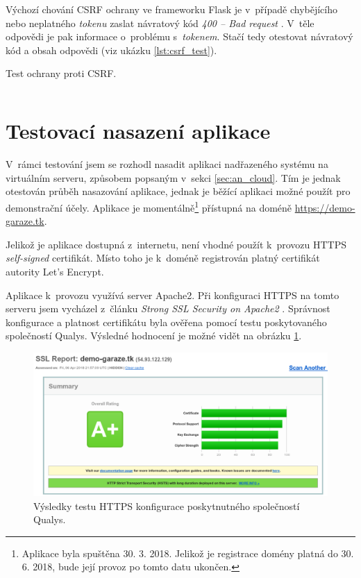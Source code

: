 Výchozí chování CSRF ochrany ve frameworku Flask je v~případě chybějícího nebo neplatného \textit{tokenu} zaslat návratový kód \textit{400 -- Bad request} \cite{flask_wtf}. V~těle odpovědi je pak informace o~problému s~\textit{tokenem}. Stačí tedy otestovat návratový kód a obsah odpovědi (viz ukázku \ref{lst:csrf_test}).

\begin{listing}[htbp]
\caption{\label{lst:csrf_test} Test ochrany proti CSRF.}
\inputminted[bgcolor=codebg]{python}{source-samples/csrf_test.py}
\end{listing}

\section{Testovací nasazení aplikace}
\label{sec:te_deployment}

V~rámci testování jsem se rozhodl nasadit aplikaci nadřazeného systému na virtuálním serveru, způsobem popsaným v~sekci \ref{sec:an_cloud}. Tím je jednak otestován průběh nasazování aplikace, jednak je běžící aplikaci možné použít pro demonstrační účely. Aplikace je momentálně\footnote{Aplikace byla spuštěna 30. 3. 2018. Jelikož je registrace domény platná do 30. 6. 2018, bude její provoz po tomto datu ukončen.} přístupná na doméně \url{https://demo-garaze.tk}.

Jelikož je aplikace dostupná z~internetu, není vhodné použít k~provozu HTTPS \textit{self-signed} certifikát. Místo toho je k~doméně registrován platný certifikát autority Let's Encrypt.

Aplikace k~provozu využívá server Apache2. Při konfiguraci HTTPS na tomto serveru jsem vycházel z~článku \textit{Strong SSL Security on Apache2} \cite{apache_ssl}. Správnost konfigurace a platnost certifikátu byla ověřena pomocí testu poskytovaného společností Qualys. Výsledné hodnocení je možné vidět na obrázku \ref{fig:ssl_test}.

\begin{figure}[h!]
    \centering
    \includegraphics[width=\textwidth]{images/ssl_test.png}
    \caption[Výsledky testu HTTPS konfigurace]{Výsledky testu HTTPS konfigurace poskytnutného společností Qualys.}
    \label{fig:ssl_test}
\end{figure}

